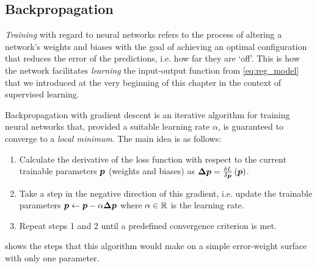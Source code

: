 \documentclass[../main.tex]{subfiles}
\begin{document}
\subsection{Backpropagation}
\emph{Training} with regard to neural networks refers to the process of altering a network's weights and biases with the goal of achieving an optimal configuration that reduces the error of the predictions, i.e. how far they are `off'. 
This is how the network facilitates \emph{learning} the input-output function from \cref{eq:reg_model} that we introduced at the very beginning of this chapter in the context of supervised learning.

Backpropagation with gradient descent is an iterative algorithm for training neural networks that, provided a suitable learning rate $\alpha$, is guaranteed to converge to a \emph{local minimum}.
The main idea is as follows:
\begin{enumerate}
    \item Calculate the derivative of the loss function with respect to the current trainable parameters ${\bm{p}}$ (weights and biases) as
        $\bm{\Delta p} = \frac{\delta L}{\delta {\bm{p}}}\left({\bm{p}}\right)$.
    \item Take a step in the negative direction of this gradient, i.e. update the trainable parameters ${\bm{p}} \leftarrow {\bm{p}} - \alpha \bm{\Delta p}$ where $\alpha \in \mathbb{R}$ is the learning rate.
    \item Repeat steps 1 and 2 until a predefined convergence criterion is met.
\end{enumerate}
 shows the steps that this algorithm would make on a simple error-weight surface with only one parameter.
\end{document}
